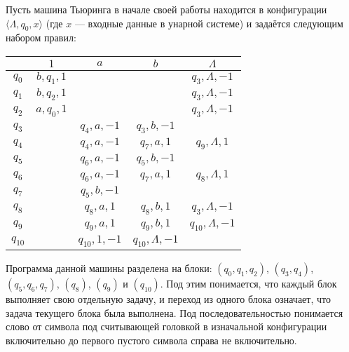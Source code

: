 \documentclass[a4paper,12pt]{article}
\newcommand {\gu} [1] {\guillemotleft#1\guillemotright}
\begin{document}
    Пусть машина Тьюринга в начале своей работы находится в конфигурации $\langle \Lambda, q_0, x\rangle$ (где $x$ --- входные данные в унарной системе) и задаётся следующим набором правил:
    \begin{center}
        \begin{tabular}{c||c|c|c|c}
            \boldmath & \boldmath $1$ & \boldmath $a$ & \boldmath $b$ & \boldmath $\Lambda$ \\
            \hline
            \hline
            \boldmath $q_0$ & $b, q_1, 1$ & & & $q_3, \Lambda, -1$\\
            \boldmath $q_1$ & $b, q_2, 1$ & & & $q_3, \Lambda, -1$\\
            \boldmath $q_2$ & $a, q_0, 1$ & & & $q_3, \Lambda, -1$\\
            \boldmath $q_3$ & & $q_4, a, -1$ & $q_3, b, -1$ & \\
            \boldmath $q_4$ & & $q_4, a, -1$ & $q_7, a, 1$ & $q_9, \Lambda, 1$\\
            \boldmath $q_5$ & & $q_6, a, -1$ & $q_5, b, -1$ & \\
            \boldmath $q_6$ & & $q_6, a, -1$ & $q_7, a, 1$ & $q_8, \Lambda, 1$\\
            \boldmath $q_7$ & & $q_5, b, -1$ & & \\
            \boldmath $q_8$ & & $q_8, a, 1$ & $q_8, b, 1$ & $q_3, \Lambda, -1$\\
            \boldmath $q_9$ & & $q_9, a, 1$ & $q_9, b, 1$ & $q_{10}, \Lambda, -1$\\
            \boldmath $q_{10}$ & & $q_{10}, 1, -1$ & $q_{10}, \Lambda, -1$ & \\
        \end{tabular}
    \end{center}
    \gu{Программа} данной машины разделена на \gu{блоки}: $(q_0, q_1, q_2)$, $(q_3, q_4)$, $(q_5, q_6, q_7)$, $(q_8)$, $(q_9)$ и $(q_{10})$. Под этим понимается, что каждый блок выполняет свою отдельную задачу, и переход из одного блока означает, что задача текущего блока была выполнена. Под \gu{последовательностью} понимается слово от символа под считывающей головкой в изначальной конфигурации включительно до первого пустого символа справа не включительно.
\end{document}
